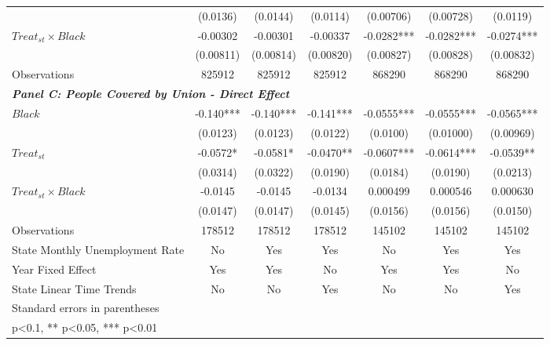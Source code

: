 \begin{table}[ht!]
\begin{tabular}{l*{6}{c}}
&    (0.0136)   &    (0.0144)   &    (0.0114)   &   (0.00706)   &   (0.00728)   &    (0.0119)   \\
[1em]
$ Treat_{st} \times Black $&    -0.00302   &    -0.00301   &    -0.00337   &     -0.0282***&     -0.0282***&     -0.0274***\\
&   (0.00811)   &   (0.00814)   &   (0.00820)   &   (0.00827)   &   (0.00828)   &   (0.00832)   \\
\hline
Observations        &      825912   &      825912   &      825912   &      868290   &      868290   &      868290   \\
\hline
\multicolumn{3}{l}{\linebreak \textbf{\textit{Panel C: People Covered by Union - Direct Effect}}} \\
$ Black $           &      -0.140***&      -0.140***&      -0.141***&     -0.0555***&     -0.0555***&     -0.0565***\\
&    (0.0123)   &    (0.0123)   &    (0.0122)   &    (0.0100)   &   (0.01000)   &   (0.00969)   \\
[1em]
$ Treat_{st} $      &     -0.0572*  &     -0.0581*  &     -0.0470** &     -0.0607***&     -0.0614***&     -0.0539** \\
&    (0.0314)   &    (0.0322)   &    (0.0190)   &    (0.0184)   &    (0.0190)   &    (0.0213)   \\
[1em]
$ Treat_{st} \times Black $&     -0.0145   &     -0.0145   &     -0.0134   &    0.000499   &    0.000546   &    0.000630   \\
&    (0.0147)   &    (0.0147)   &    (0.0145)   &    (0.0156)   &    (0.0156)   &    (0.0150)   \\
\hline
Observations        &      178512   &      178512   &      178512   &      145102   &      145102   &      145102   \\
\hline
State Monthly Unemployment Rate&          No   &         Yes   &         Yes   &          No   &         Yes   &         Yes   \\
Year Fixed Effect   &         Yes   &         Yes   &          No   &         Yes   &         Yes   &          No   \\
State Linear Time Trends&          No   &          No   &         Yes   &          No   &          No   &         Yes   \\
\hline\hline
\multicolumn{7}{l}{\footnotesize Standard errors in parentheses}\\
\multicolumn{7}{l}{\footnotesize * p<0.1, ** p<0.05, *** p<0.01}\\
\end{tabular}
\end{table}
